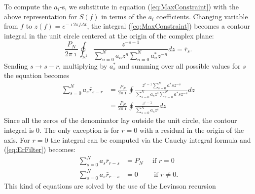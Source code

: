 \documentclass[twocolumn,showpacs,preprintnumbers,nofootinbib,prd,
superscriptaddress,10pt]{revtex4-1}
\begin{document}
To compute the $a_i$-s, we substitute in equation
(\ref{eq:MaxConstraint}) with the above representation for $S(f)$ in terms of the $a_i$ coefficients. Changing  variable from $f$ to $z(f) = e^{-\imath 2 \pi f \Delta t}$, the integral (\ref{eq:MaxConstraint}) becomes a contour integral in the unit circle centered at the origin of the complex plane: 
\begin{equation}
   \frac{P_N}{2 \pi \imath} \oint _{\mathbb S^1}\frac{z^{-s - 1}}{\sum_{n = 0}^N a_n z^n \sum_{n = 0}^N a^*_n z^{-n}}dz = \bar r_s. 
\end{equation}
Sending $s \to s - r$, multiplying by $a^*_s$ and summing over all possible values for $s$ the equation becomes 
\begin{align} \nonumber 
    \sum_{s = 0}^N a_s \bar r_{s - r} &= \frac{P_N}{2 \pi \imath}\oint \frac{z^{r - 1} \sum_{s = 0}^N a^*s z^{-s}}{\sum_{s = 0}^N a_s z^s \sum_{s = 0}^N a^*s z^{-s}} dz\\
    & = \frac{P_N}{2 \pi \imath}\oint \frac{z^{r -1}}{\sum_{s = 0}^N a_s z^s}dz\label{eq:ErFilter}
\end{align}
Since all the zeros of the denominator lay outside the unit circle, the contour integral is 0. The only exception is for $r = 0$ with a residual in the origin of the axis. For $r = 0$ the integral can be computed via the Cauchy integral formula and (\ref{eq:ErFilter}) becomes: 
\begin{align}\label{eq:errorFilter1}
    \sum_{s = 0}^N a_s \bar r_{r - s} &= P_N \quad \text{ if } r = 0 \\ \label{eq:errorFilter2}
    \sum_{s = 0}^N a_s \bar r_{r - s} & = 0 \qquad \text{ if } r \neq 0.
\end{align}
This kind of equations are solved by the use of the Levinson recursion \cite{doi:10.1002/sapm1946251261}
\end{document}
